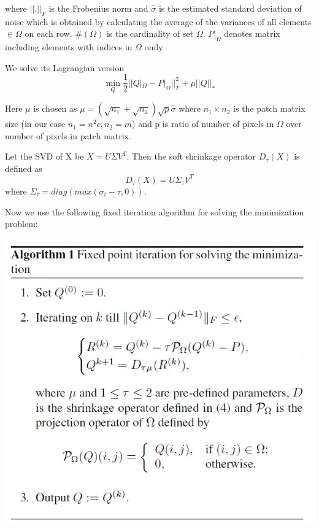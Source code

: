 \documentclass{article}
\begin{document}
where $||.||_F$ is the Frobenius norm and $\hat{\sigma}$ is the estimated standard deviation of noise which is obtained by calculating the average of the variances of all elements $\in \Omega$ on each row.
$\#(\Omega)$ is the cardinality of set $\Omega$. $P|_{\Omega}$ denotes matrix including elements with indices in $\Omega$ omly

We solve its Lagrangian version 
\begin{equation*}
    \min_{Q} \frac{1}{2} ||Q|_{\Omega} - P|_{\Omega}||_F^2 + \mu ||Q||_{*}
\end{equation*}

Here $\mu$ is chosen as $\mu = (\sqrt{n_1} + \sqrt{n_2})\sqrt{p}\hat{\sigma}$ where $n_1 \times n_2$ is the patch matrix size (in our case $n_1 = n^2c, n_2=m$) and p is ratio of number of pixels in $\Omega$ over number of pixels in patch matrix. 

Let the SVD of X be $X = U\Sigma V^T$. Then the soft shrinkage operator $D_\tau (X)$ is defined as 
\begin{equation*}
    D_{\tau}(X) = U\Sigma_{\tau} V^T
\end{equation*}
where $\Sigma_{\tau} = diag(max(\sigma_i - \tau, 0))$.

Now we use the following fixed iteration algorithm \cite{svt} for solving the minimization problem:

\begin{center}
    \includegraphics[scale=0.6]{algo.jpg}
\end{center}
\end{document}
